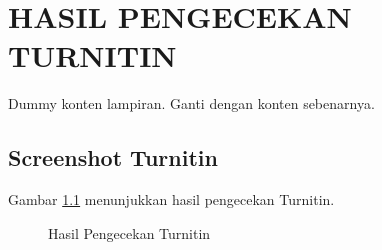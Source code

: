 \chapter{HASIL PENGECEKAN TURNITIN}
\label{lamp:turnitin}

Dummy konten lampiran. Ganti dengan konten sebenarnya.

\section{Screenshot Turnitin}
\label{sec:screenshot_turnitin}

Gambar \ref{fig:turnitin} menunjukkan hasil pengecekan Turnitin.

\begin{figure}[h]
    \centering
    \caption{Hasil Pengecekan Turnitin}
    \label{fig:turnitin}
\end{figure}